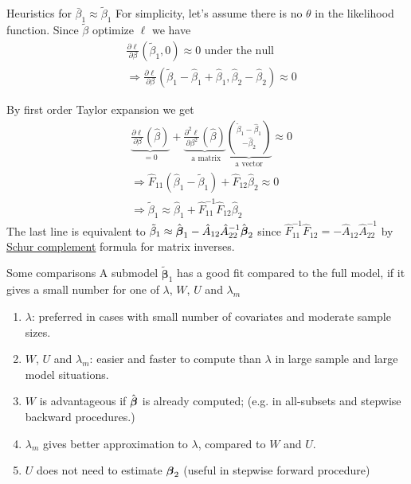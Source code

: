 \documentclass{beamer}
\begin{document}
\begin{frame} {Heuristics for $\bar{\beta}_1 \approx \tilde{\beta}_1$}
For simplicity,  let's assume there is no $\theta$ in the likelihood function.   Since $\tilde{\beta}$ optimize $\ell$ we have 
\begin{align*}
&\frac{\partial \ell }{\partial \beta}(\tilde{\beta}_1, 0) \approx 0 \text{ under the null}\\
&\Rightarrow  \frac{\partial \ell }{\partial \beta}(\tilde{\beta}_1 - \hat{\beta}_1 + \hat{\beta}_1 , \hat{\beta}_2 - \hat{\beta}_2) \approx  0
\end{align*}

By first order Taylor expansion we get
\begin{align*}
&\underbrace{\frac{\partial \ell }{\partial \beta} \left( \hat{\beta}\right)}_{= 0 } + \underbrace{ \frac{\partial^2 \ell}{\partial \beta^2} \left(\hat{\beta}\right)}_{\text{ a matrix}} \underbrace{\binom{\tilde{\beta}_1- \hat{\beta}_1}{ - \hat{\beta}_2}}_{\text{a vector}}
\approx 0\\
&\Rightarrow \hat{F}_{11} (\hat{\beta}_1 - \tilde{\beta}_1) + \hat{F}_{12} \hat{\beta}_2 \approx  0 \\
& \Rightarrow \tilde{\beta}_1  \approx \hat{\beta}_1 + \hat{F}_{11}^{-1} \hat{F}_{12} \hat{\beta}_2
 \end{align*}
The last line is equivalent to $ \tilde{\beta}_1  \approx \hat{\mbox{\boldmath $\beta$}}_1-\hat{A}_{12}\hat{A}_{22}^{-1}
\hat{\mbox{\boldmath $\beta$}}_2 $ since $\hat{F}_{11}^{-1} \hat{F}_{12} = -\hat{A}_{12}\hat{A}_{22}^{-1}
$ by \href{https://en.wikipedia.org/wiki/Schur_complement}{Schur complement} formula for matrix inverses.  
\end{frame}

\begin{frame}{Some comparisons }
A submodel $\tilde{\boldsymbol \beta}_1$ has a good fit  compared to the full model,  if it gives a small number for one of $\lambda$, $W$, $U$ and $\lambda_m$
\begin{enumerate}
\item
$\lambda$: preferred in cases with small number of covariates and moderate sample sizes.
\item
$W$, $U$ and $\lambda_m$: easier and faster to compute than $\lambda$ in large sample and large model situations.
\item
$W$ is advantageous if $\hat{\mbox{\boldmath $\beta$}}$ is already computed; (e.g. in all-subsets and
stepwise backward procedures.)
\item
$\lambda_m$ gives better approximation to $\lambda$, compared to $W$ and $U$.
\item
$U$ does not need to estimate $\mbox{\boldmath $\beta$}_2$ (useful in stepwise forward procedure)
\end{enumerate}
\end{frame}
\end{document}
